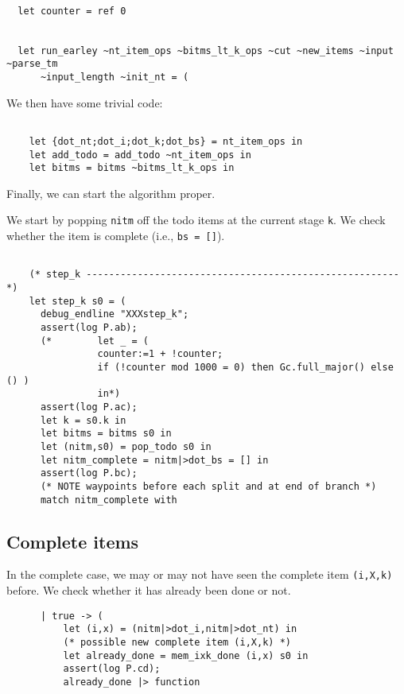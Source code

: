 \documentclass[]{article}
\begin{document}
\begin{multicols}{2}
\begin{verbatim}

  let counter = ref 0


  let run_earley ~nt_item_ops ~bitms_lt_k_ops ~cut ~new_items ~input ~parse_tm 
      ~input_length ~init_nt = (

\end{verbatim}

We then have some trivial code:

\begin{verbatim}

    let {dot_nt;dot_i;dot_k;dot_bs} = nt_item_ops in
    let add_todo = add_todo ~nt_item_ops in
    let bitms = bitms ~bitms_lt_k_ops in

\end{verbatim}

Finally, we can start the algorithm proper.

We start by popping \texttt{nitm} off the todo items at the current
stage \texttt{k}. We check whether the item is complete (i.e.,
\texttt{bs = {[}{]}}).

\begin{verbatim}

    (* step_k ------------------------------------------------------- *)
    let step_k s0 = (
      debug_endline "XXXstep_k";
      assert(log P.ab);
      (*        let _ = (
                counter:=1 + !counter; 
                if (!counter mod 1000 = 0) then Gc.full_major() else () )
                in*)
      assert(log P.ac);
      let k = s0.k in    
      let bitms = bitms s0 in
      let (nitm,s0) = pop_todo s0 in
      let nitm_complete = nitm|>dot_bs = [] in
      assert(log P.bc);  
      (* NOTE waypoints before each split and at end of branch *)
      match nitm_complete with
\end{verbatim}

\subsection{Complete items}

In the complete case, we may or may not have seen the complete item
\texttt{(i,X,k)} before. We check whether it has already been done or
not.

\begin{verbatim}
      | true -> (
          let (i,x) = (nitm|>dot_i,nitm|>dot_nt) in
          (* possible new complete item (i,X,k) *)
          let already_done = mem_ixk_done (i,x) s0 in
          assert(log P.cd);          
          already_done |> function
\end{verbatim}


\end{multicols}
\end{document}
